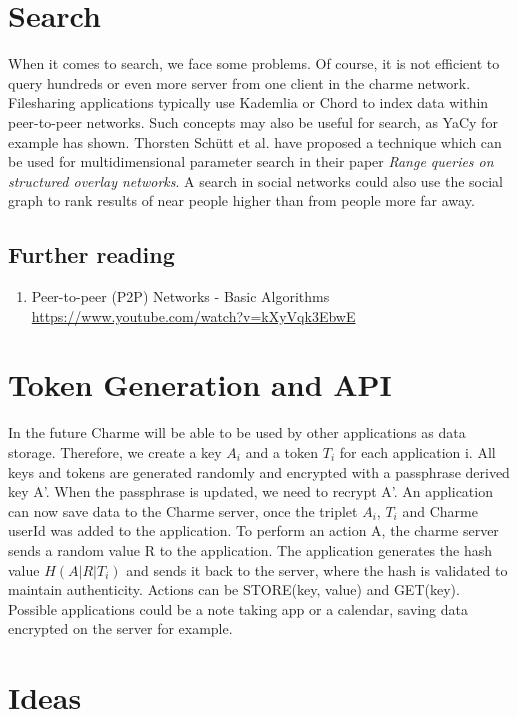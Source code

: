 \documentclass{scrartcl}
\begin{document}
  \section{Search}
  When it comes to search, we face some problems. Of course, it is not efficient to query hundreds or even more server from one client in the charme network. Filesharing applications typically use Kademlia  or Chord to index data within peer-to-peer networks. Such concepts may also be useful for search, as YaCy for example has shown. Thorsten Schütt et al. have proposed a technique which can be used for multidimensional parameter search in their paper \textit{Range queries on structured overlay networks}. A search in social networks could also use the social graph to rank results of near people higher than from people more far away.
  


\subsection{Further reading}
\begin{enumerate}
\item Peer-to-peer (P2P) Networks - Basic Algorithms \\\url{https://www.youtube.com/watch?v=kXyVqk3EbwE} %
\end{enumerate}

  \section{Token Generation and API}
  In the future Charme will be able to be used by other applications as data storage. Therefore, we create a key $A_i$ and a token $T_i$ for each application i.
All keys and tokens are generated randomly and encrypted with a passphrase derived key A'. When the passphrase is updated, we need to recrypt A'.
An application can now save data to the Charme server, once the triplet $A_i$, $T_i$ and Charme userId was added to the application.
To perform an action A, the charme server sends a random value R to the application. The application generates the hash value $H(A|R|T_i)$ and sends it back to the server, where the hash is validated to maintain authenticity. Actions can be  STORE(key, value) and GET(key). Possible applications could be a note taking app or a calendar, saving data encrypted on the server for example.

\section{Ideas}
\end{document}
